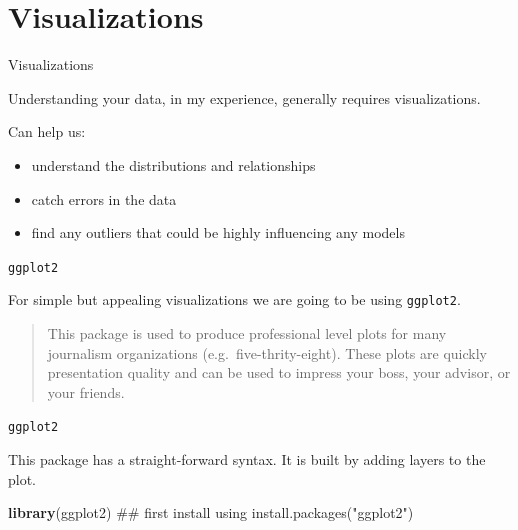 \documentclass[10pt,ignorenonframetext,]{beamer}
\newenvironment{Shaded}{\begin{snugshade}}{\end{snugshade}}
\newcommand{\KeywordTok}[1]{\textcolor[rgb]{0.13,0.29,0.53}{\textbf{{#1}}}}
\newcommand{\NormalTok}[1]{{#1}}
\providecommand{\tightlist}{%
\setlength{\itemsep}{0pt}\setlength{\parskip}{0pt}}
\begin{document}
\section{Visualizations}\label{visualizations}

\begin{frame}{Visualizations}

Understanding your data, in my experience, generally requires
visualizations.

Can help us:

\begin{itemize}
\tightlist
\item
  understand the distributions and relationships
\item
  catch errors in the data
\item
  find any outliers that could be highly influencing any models
\end{itemize}

\end{frame}

\begin{frame}[fragile]{\texttt{ggplot2}}

For simple but appealing visualizations we are going to be using
\texttt{ggplot2}.

\begin{quote}
This package is used to produce professional level plots for many
journalism organizations (e.g.~five-thrity-eight). These plots are
quickly presentation quality and can be used to impress your boss, your
advisor, or your friends.
\end{quote}

\end{frame}

\begin{frame}[fragile]{\texttt{ggplot2}}

This package has a straight-forward syntax. It is built by adding layers
to the plot.

\begin{Shaded}
\begin{Highlighting}[]
\KeywordTok{library}\NormalTok{(ggplot2)   ## first install using install.packages("ggplot2")}
\end{Highlighting}
\end{Shaded}

\end{frame}
\end{document}
